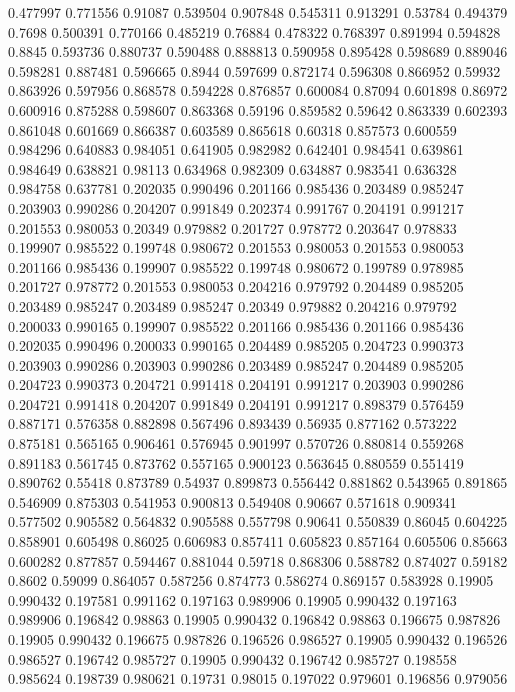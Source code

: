 0.477997 0.771556
0.91087 0.539504
0.907848 0.545311
0.913291 0.53784
0.494379 0.7698
0.500391 0.770166
0.485219 0.76884
0.478322 0.768397
0.891994 0.594828
0.8845 0.593736
0.880737 0.590488
0.888813 0.590958
0.895428 0.598689
0.889046 0.598281
0.887481 0.596665
0.8944 0.597699
0.872174 0.596308
0.866952 0.59932
0.863926 0.597956
0.868578 0.594228
0.876857 0.600084
0.87094 0.601898
0.86972 0.600916
0.875288 0.598607
0.863368 0.59196
0.859582 0.59642
0.863339 0.602393
0.861048 0.601669
0.866387 0.603589
0.865618 0.60318
0.857573 0.600559
0.984296 0.640883
0.984051 0.641905
0.982982 0.642401
0.984541 0.639861
0.984649 0.638821
0.98113 0.634968
0.982309 0.634887
0.983541 0.636328
0.984758 0.637781
0.202035 0.990496
0.201166 0.985436
0.203489 0.985247
0.203903 0.990286
0.204207 0.991849
0.202374 0.991767
0.204191 0.991217
0.201553 0.980053
0.20349 0.979882
0.201727 0.978772
0.203647 0.978833
0.199907 0.985522
0.199748 0.980672
0.201553 0.980053
0.201553 0.980053
0.201166 0.985436
0.199907 0.985522
0.199748 0.980672
0.199789 0.978985
0.201727 0.978772
0.201553 0.980053
0.204216 0.979792
0.204489 0.985205
0.203489 0.985247
0.203489 0.985247
0.20349 0.979882
0.204216 0.979792
0.200033 0.990165
0.199907 0.985522
0.201166 0.985436
0.201166 0.985436
0.202035 0.990496
0.200033 0.990165
0.204489 0.985205
0.204723 0.990373
0.203903 0.990286
0.203903 0.990286
0.203489 0.985247
0.204489 0.985205
0.204723 0.990373
0.204721 0.991418
0.204191 0.991217
0.203903 0.990286
0.204721 0.991418
0.204207 0.991849
0.204191 0.991217
0.898379 0.576459
0.887171 0.576358
0.882898 0.567496
0.893439 0.56935
0.877162 0.573222
0.875181 0.565165
0.906461 0.576945
0.901997 0.570726
0.880814 0.559268
0.891183 0.561745
0.873762 0.557165
0.900123 0.563645
0.880559 0.551419
0.890762 0.55418
0.873789 0.54937
0.899873 0.556442
0.881862 0.543965
0.891865 0.546909
0.875303 0.541953
0.900813 0.549408
0.90667 0.571618
0.909341 0.577502
0.905582 0.564832
0.905588 0.557798
0.90641 0.550839
0.86045 0.604225
0.858901 0.605498
0.86025 0.606983
0.857411 0.605823
0.857164 0.605506
0.85663 0.600282
0.877857 0.594467
0.881044 0.59718
0.868306 0.588782
0.874027 0.59182
0.8602 0.59099
0.864057 0.587256
0.874773 0.586274
0.869157 0.583928
0.19905 0.990432
0.197581 0.991162
0.197163 0.989906
0.19905 0.990432
0.197163 0.989906
0.196842 0.98863
0.19905 0.990432
0.196842 0.98863
0.196675 0.987826
0.19905 0.990432
0.196675 0.987826
0.196526 0.986527
0.19905 0.990432
0.196526 0.986527
0.196742 0.985727
0.19905 0.990432
0.196742 0.985727
0.198558 0.985624
0.198739 0.980621
0.19731 0.98015
0.197022 0.979601
0.196856 0.979056
